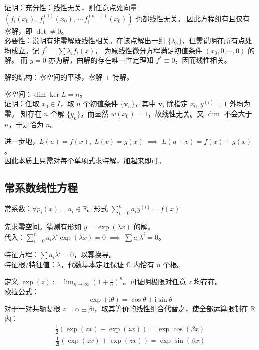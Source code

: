 \documentclass[12pt, a4paper, UTF8, openany]{ctexbook}
\newcommand{\field}[1]{\mathbb{#1}}%
\newcommand{\imunit}{\mathrm{i}}%
\newcommand{\mat}[1]{\mathbf{#1}}
\begin{document}
        证明：充分性：线性无关，则任意点处向量 $(f_i(x_0),\, f_i^{(1)}(x_0), \, \cdots \, f_i^{(n - 1)}(x_0))$ 也都线性无关。
        因此方程组有且仅有零解，即 $\det \neq 0$。\\
        必要性：说明有非零解既线性相关。在该点解出一组 $\{\lambda_n\}$，但需说明在所有点处均成立。记 $f^\ast = \sum\lambda_i f_i(x)$，
        为原线性微分方程满足初值条件 $(x_0, 0, \cdots, 0)$ 的解。
        而 $y = 0$ 亦为解，由解的存在唯一性定理知 $f^\ast \equiv 0$，因而线性相关。

        解的结构：零空间的平移，零解 + 特解。

        零空间：$\dim \ker L = n$。\\
        证明：任取 $x_0 \in I$，取 $n$ 个初值条件 $\{\mat{v}_n\}$，其中 $\mat{v}_i$ 除指定 $x_0, y^{(i)} = 1$ 外均为零。
        知存在 $n$ 个解 $\{y_n\}$，而显然 $w(x_0) = 1$，故线性无关。又 $\dim$ 不会大于 $n$，于是恰为 $n$。

        进一步地，$L(u) = f(x), \; L(v) = g(x) \; \implies \; L(u + v) = f(x) + g(x)$。\\
        因此本质上只需对每个单项式求特解，加起来即可。

        \subsection{常系数线性方程}
        常系数：$\forall p_i(x) = a_i \in \field{R}$。形式 $\sum\limits_{i = 0}^{n} a_i y^{(i)} = f(x)$

        先求零空间。猜测有形如 $y = \exp(\lambda x)$ 的解。\\
        代入：$\sum\limits_{i = 0}^{n} a_i \lambda^i \exp(\lambda x) = 0 \;\implies\; \sum a_i \lambda^i = 0$。

        特征方程：$\sum a_i \lambda^i = 0$，以幂换导。\\
        特征根/特征值：$\lambda$，代数基本定理保证 $\field{C}$ 内恰有 $n$ 个根。

        定义 $\exp(z) := \lim_{n \to \infty} (1 + \frac{z}{n})^n$。可证明极限对任意 $z$ 均存在。\\
        欧拉公式：$$\exp(\imunit \theta) = \cos\theta + \imunit\sin\theta$$
        对于一对共轭复根 $z = \alpha \pm \beta\imunit$，取其等价的线性组合代替之，使全部运算限制在 $\field{R}$ 内：
        $$\begin{aligned}
            \frac{1}{2}(\exp(zx) + \exp(\bar{z}x)) = \exp\cos(\beta x) \\
            \frac{1}{2\imunit}(\exp(zx) + \exp(\bar{z}x)) = \exp\sin(\beta x)
        \end{aligned}$$
\end{document}
